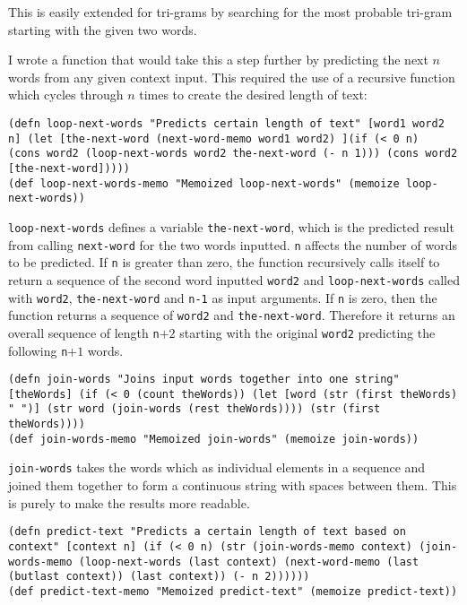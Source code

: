 This is easily extended for tri-grams by searching for the most probable tri-gram starting with the given two words.

I wrote a function that would take this a step further by predicting the next $n$ words from any given context input. This required the use of a recursive function which cycles through $n$ times to create the desired length of text:

\begin{lstlisting}
(defn loop-next-words "Predicts certain length of text" [word1 word2 n] (let [the-next-word (next-word-memo word1 word2) ](if (< 0 n)  (cons word2 (loop-next-words word2 the-next-word (- n 1))) (cons word2 [the-next-word])))) 
(def loop-next-words-memo "Memoized loop-next-words" (memoize loop-next-words))
\end{lstlisting}

\lstinline!loop-next-words! defines a variable \lstinline!the-next-word!, which is the predicted result from calling \lstinline!next-word! for the two words inputted. \lstinline!n! affects the number of words to be predicted. If \lstinline!n! is greater than zero, the function recursively calls itself to return a sequence of the second word inputted \lstinline!word2! and \lstinline!loop-next-words! called with \lstinline!word2!, \lstinline!the-next-word! and \lstinline!n-1! as input arguments. If \lstinline!n! is zero, then the function returns a sequence of \lstinline!word2! and \lstinline!the-next-word!. Therefore it returns an overall sequence of length \lstinline!n!$+2$ starting with the original \lstinline!word2! predicting the following \lstinline!n!$+1$ words.

\begin{lstlisting}
(defn join-words "Joins input words together into one string" [theWords] (if (< 0 (count theWords)) (let [word (str (first theWords) " ")] (str word (join-words (rest theWords)))) (str (first theWords))))
(def join-words-memo "Memoized join-words" (memoize join-words))
\end{lstlisting}

\lstinline!join-words! takes the words which as individual elements in a sequence and joined them together to form a continuous string with spaces between them. This is purely to make the results more readable.

\begin{lstlisting}
(defn predict-text "Predicts a certain length of text based on context" [context n] (if (< 0 n) (str (join-words-memo context) (join-words-memo (loop-next-words (last context) (next-word-memo (last (butlast context)) (last context)) (- n 2)))))) 
(def predict-text-memo "Memoized predict-text" (memoize predict-text))
\end{lstlisting}

